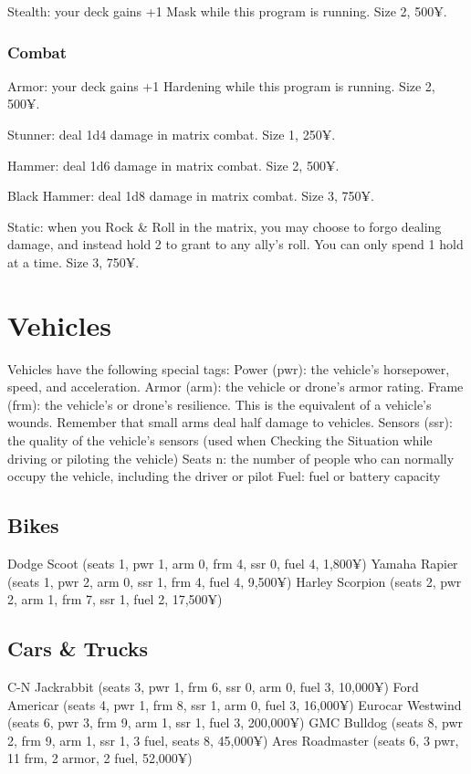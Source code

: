 Stealth: your deck gains +1 Mask while this program is running. Size 2, 500¥.

\subsubsection{Combat}
Armor: your deck gains +1 Hardening while this program is running. Size 2, 500¥.

Stunner: deal 1d4 damage in matrix combat. Size 1, 250¥.

Hammer: deal 1d6 damage in matrix combat. Size 2, 500¥.

Black Hammer: deal 1d8 damage in matrix combat. Size 3, 750¥.

Static: when you Rock \& Roll in the matrix, you may choose to forgo dealing damage, and instead hold 2 to grant to any ally’s roll. You can only spend 1 hold at a time. Size 3, 750¥.


\section{Vehicles}

Vehicles have the following special tags:
Power (pwr): the vehicle’s horsepower, speed, and acceleration.
Armor (arm): the vehicle or drone’s armor rating.
Frame (frm): the vehicle’s or drone’s resilience. This is the equivalent of a vehicle’s wounds. Remember that small arms deal half damage to vehicles.
Sensors (ssr): the quality of the vehicle’s sensors (used when Checking the Situation while driving or piloting the vehicle)
Seats n: the number of people who can normally occupy the vehicle, including the driver or pilot
Fuel: fuel or battery capacity


\subsection{Bikes}

Dodge Scoot (seats 1, pwr 1, arm 0, frm 4, ssr 0, fuel 4, 1,800¥)
Yamaha Rapier (seats 1, pwr 2, arm 0, ssr 1, frm 4, fuel 4, 9,500¥)
Harley Scorpion (seats 2, pwr 2, arm 1, frm 7, ssr 1, fuel 2, 17,500¥)


\subsection{Cars \& Trucks}

C-N Jackrabbit (seats 3, pwr 1, frm 6, ssr 0, arm 0, fuel 3, 10,000¥)
Ford Americar (seats 4, pwr 1, frm 8, ssr 1, arm 0, fuel 3, 16,000¥)
Eurocar Westwind (seats 6, pwr 3, frm 9, arm 1, ssr 1, fuel 3, 200,000¥)
GMC Bulldog (seats 8, pwr 2, frm 9, arm 1, ssr 1, 3 fuel, seats 8, 45,000¥)
Ares Roadmaster (seats 6, 3 pwr, 11 frm, 2 armor, 2 fuel, 52,000¥)



